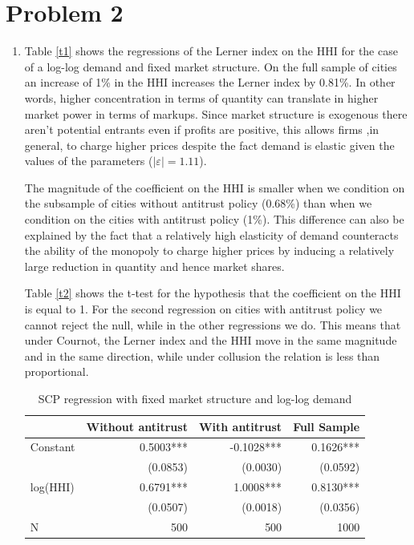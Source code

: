 \documentclass[11pt,english]{article}
\begin{document}
\section{Problem 2}

\begin{enumerate}

\item Table \eqref{t1} shows the regressions of the Lerner index on the HHI for the case of a log-log demand and fixed market structure. On the full sample of cities an increase of 1\% in the HHI increases the Lerner index by 0.81\%. In other words, higher concentration in terms of quantity can translate in higher market power in terms of markups.  Since market structure is exogenous there aren't potential entrants even if profits are positive, this allows firms ,in general, to charge higher prices despite the fact demand is elastic given the values of the parameters ($|\varepsilon|=1.11$).

The magnitude of the coefficient on the HHI is smaller when we condition on the subsample of cities without antitrust policy (0.68\%) than when we condition on the cities with antitrust policy (1\%). This difference can also be explained by the fact that a relatively high elasticity of demand counteracts the ability of the monopoly to charge higher prices by inducing a relatively large reduction in quantity and hence market shares. 

Table \eqref{t2} shows the t-test for the hypothesis that the coefficient on the HHI is equal to 1. For the second regression on cities with antitrust policy we cannot reject the null, while in the other regressions we do. This means that under Cournot, the Lerner index and the HHI move in the same magnitude and in the same direction, while under collusion the relation is less than proportional.


\begin{table}[H]
  \centering
  \caption{SCP regression with fixed market structure and log-log demand}
    \begin{tabular}{lrrr}
    \hline
          & Without antitrust & With antitrust & Full Sample \\
    \hline
    Constant & 0.5003*** & -0.1028*** & 0.1626*** \\
        & (0.0853) & (0.0030) & (0.0592) \\
    log(HHI) & 0.6791*** & 1.0008*** & 0.8130*** \\
        & (0.0507) & (0.0018) & (0.0356) \\
        N &500 & 500& 1000\\
    \hline
    \end{tabular}%
  \label{t1}%
\end{table}


\end{enumerate}
\end{document}
